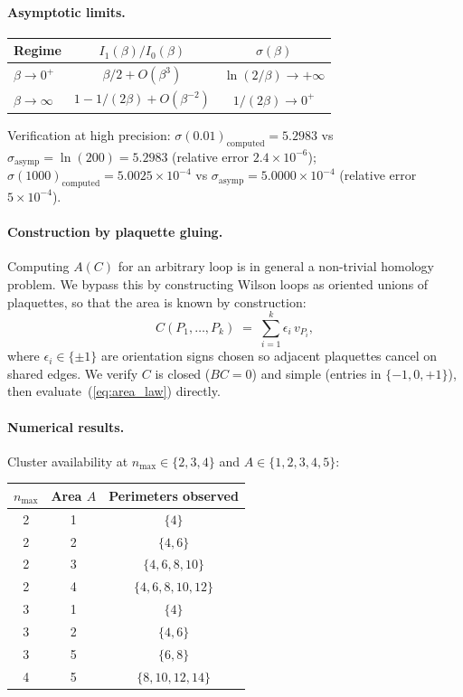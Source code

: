\documentclass[11pt]{article}
\begin{document}
\paragraph{Asymptotic limits.}
\begin{center}
\begin{tabular}{lcc}
\toprule
Regime & $I_1(\beta)/I_0(\beta)$ & $\sigma(\beta)$ \\
\midrule
$\beta\to 0^+$ & $\beta/2+O(\beta^3)$ & $\ln(2/\beta)\to +\infty$ \\
$\beta\to\infty$ & $1-1/(2\beta)+O(\beta^{-2})$ & $1/(2\beta)\to 0^+$ \\
\bottomrule
\end{tabular}
\end{center}

Verification at high precision:
$\sigma(0.01)_\text{computed}=5.2983$ vs $\sigma_\text{asymp}=\ln(200)=5.2983$
(relative error $2.4\times 10^{-6}$);
$\sigma(1000)_\text{computed}=5.0025\times 10^{-4}$ vs $\sigma_\text{asymp}=5.0000\times 10^{-4}$
(relative error $5\times 10^{-4}$).

\paragraph{Construction by plaquette gluing.}

Computing $A(C)$ for an arbitrary loop is in general a non-trivial homology
problem. We bypass this by constructing Wilson loops as oriented unions of
plaquettes, so that the area is known by construction:
\begin{equation}
C(P_1,\ldots,P_k)\;=\;\sum_{i=1}^k\epsilon_i\,v_{P_i},
\end{equation}
where $\epsilon_i\in\{\pm 1\}$ are orientation signs chosen so adjacent
plaquettes cancel on shared edges. We verify $C$ is closed ($BC=0$) and simple
(entries in $\{-1,0,+1\}$), then evaluate~(\ref{eq:area_law}) directly.

\paragraph{Numerical results.} Cluster availability at $n_\text{max}\in\{2,3,4\}$
and $A\in\{1,2,3,4,5\}$:

\begin{center}
\begin{tabular}{ccc}
\toprule
$n_\text{max}$ & Area $A$ & Perimeters observed \\
\midrule
2 & 1 & $\{4\}$ \\
2 & 2 & $\{4,6\}$ \\
2 & 3 & $\{4,6,8,10\}$ \\
2 & 4 & $\{4,6,8,10,12\}$ \\
3 & 1 & $\{4\}$ \\
3 & 2 & $\{4,6\}$ \\
3 & 5 & $\{6,8\}$ \\
4 & 5 & $\{8,10,12,14\}$ \\
\bottomrule
\end{tabular}
\end{center}
\end{document}
